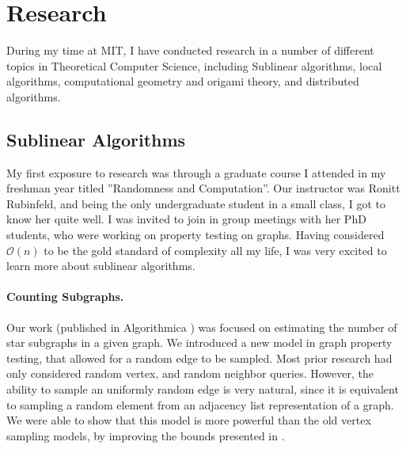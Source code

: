 \section*{Research}

During my time at MIT, I have conducted research in a number of different topics in Theoretical Computer Science,
including Sublinear algorithms, local algorithms, computational geometry and origami theory, and distributed algorithms.

\subsection*{Sublinear Algorithms}
My first exposure to research was through a graduate course I attended in my freshman year titled ''Randomness and Computation''.
Our instructor was Ronitt Rubinfeld, and being the only undergraduate student in a small class, I got to know her quite well.
I was invited to join in group meetings with her PhD students, who were working on property testing on graphs.
Having considered $ \mathcal{O}(n) $ to be the gold standard of complexity all my life,
I was very excited to learn more about sublinear algorithms.

\paragraph{Counting Subgraphs.}
Our work (published in Algorithmica \cite{stars}) was focused on estimating the number of star subgraphs in a given graph.
We introduced a new model in graph property testing, that allowed for a random edge to be sampled.
Most prior research had only considered random vertex, and random neighbor queries.
However, the ability to sample an uniformly random edge is very natural,
since it is equivalent to sampling a random element from an adjacency list representation of a graph.
We were able to show that this model is more powerful than the old vertex sampling models,
by improving the bounds presented in \cite{old_stars}.


